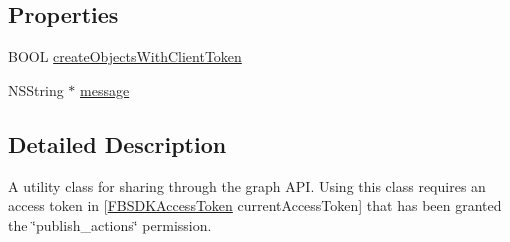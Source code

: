 \subsection*{Properties}
\begin{DoxyCompactItemize}
\item 
B\-O\-O\-L \hyperlink{interface_f_b_s_d_k_share_a_p_i_ab0a4e1f4162e1fb2b930b0a6fa235779}{create\-Objects\-With\-Client\-Token}
\item 
N\-S\-String $\ast$ \hyperlink{interface_f_b_s_d_k_share_a_p_i_a5ffe34ad98a2a26b3c347600aea194ca}{message}
\end{DoxyCompactItemize}


\subsection{Detailed Description}
A utility class for sharing through the graph A\-P\-I. Using this class requires an access token in \mbox{[}\hyperlink{interface_f_b_s_d_k_access_token}{F\-B\-S\-D\-K\-Access\-Token} current\-Access\-Token\mbox{]} that has been granted the \char`\"{}publish\-\_\-actions\char`\"{} permission. 

